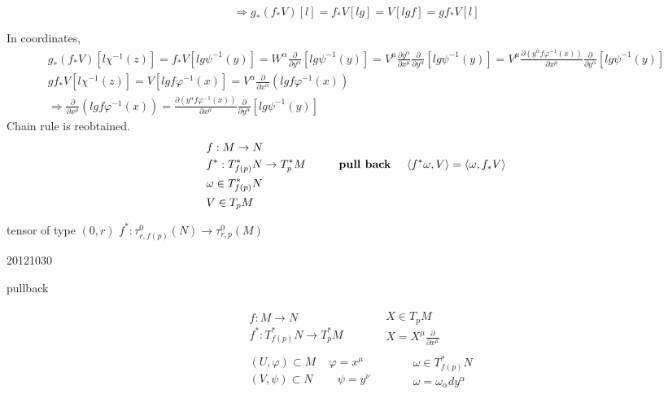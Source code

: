 \documentclass[twoside]{amsart}
\begin{document}
\[
\Longrightarrow g_*(f_*V)[l] = f_* V[lg] = V[lgf] = gf_*V[l]
\]

In coordinates, 
\[
\begin{gathered}
  g_*(f_*V)[l\chi^{-1}(z) ] = f_*V[lg\psi^{-1}(y)] = W^{\alpha} \frac{ \partial }{ \partial y^{\alpha}}[ lg\psi^{-1}(y)] = V^{\mu} \frac{ \partial y^{\alpha} }{ \partial x^{\mu} } \frac{ \partial }{ \partial y^{\alpha} } [lg\psi^{-1}(y)] = V^{\mu} \frac{ \partial (y^{\alpha}f\varphi^{-1}(x)) }{ \partial x^{\mu} } \frac{ \partial }{ \partial y^{\alpha} } [lg\psi^{-1}(y) ] \\
  gf_*V[l \chi^{-1}(z) ] = V[lgf\varphi^{-1}(x) ] = V^{\alpha} \frac{ \partial }{ \partial x^{\alpha} }( lgf\varphi^{-1}(x)) \\
  \Longrightarrow  \frac{ \partial }{ \partial x^{\mu} }( lgf\varphi^{-1}(x)) = \frac{ \partial (y^{\alpha}f\varphi^{-1}(x)) }{ \partial x^{\mu} } \frac{ \partial }{ \partial y^{\alpha} } [lg\psi^{-1}(y) ]
\end{gathered}
\]
Chain rule is reobtained. \\

\[
\begin{aligned}
  & f: M \to N \\ 
  & f^* : T^*_{f(p)}N \to T^*_p M \quad \quad \, \text{ \textbf{ pull back }}
  & \langle f^* \omega, V \rangle = \langle \omega, f_* V \rangle \\
  & \begin{aligned}
      & \omega \in T^*_{f(p)}N \\ 
      & V \in T_p M \end{aligned}
\end{aligned}
\]


tensor of type $(0,r)$ $f^*: \tau^0_{r, f(p)}(N) \to \tau^0_{r,p}(M)$

\hrulefill 

20121030

pullback

\[
\begin{gathered}
\begin{aligned}
  & f: M \to N \\ 
  & f^* : T^*_{f(p)} N \to T^*_p M \end{aligned} \quad \quad \, \begin{aligned} & X \in T_pM \\ 
  & X = X^{\mu} \frac{ \partial }{ \partial x^{\mu } } \end{aligned} \\ 
\begin{aligned}
  & (U , \varphi ) \subset M \quad \, \varphi = x^{\mu} \\ 
  & ( V, \psi ) \subset N  \quad \quad \, \psi = y^{\nu } \end{aligned} \quad \quad \, 
\begin{aligned}
  & \omega \in T^*_{f(p)} N \\ 
  & \omega = \omega_{\alpha}dy^{\alpha}
\end{aligned}
\end{gathered}
\]
\end{document}
